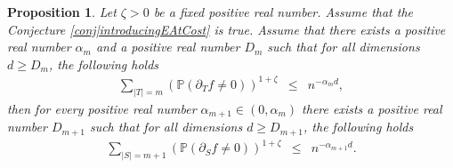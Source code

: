 \documentclass[reqno]{amsart}
\newtheorem{proposition}[theorem]{Proposition}
\begin{document}
 \begin{proposition}\label{thm|inductionStep}
Let $\zeta>0$ be a fixed positive real number. Assume that the Conjecture \ref{conj|introducingEAtCost} is true. Assume that there exists a positive real number $\alpha_m$ and a positive real number $D_m$ such that for all dimensions $d\geq D_m$, the following holds
\begin{eqnarray}
\sum_{|T|=m} \left(\mathbb P\left(\partial_Tf\neq 0\right)\right)^{1+\zeta}&\leq&  n^{-\alpha_md}, \label{eqn|boundOrderk}
\end{eqnarray}
then for every positive real number $\alpha_{m+1}\in(0,\alpha_m)$ there exists a positive real number $D_{m+1}$ such that for all dimensions $d\geq D_{m+1}$, the following holds
\begin{eqnarray}
\sum_{|S|=m+1} \left(\mathbb P\left(\partial_Sf\neq 0\right)\right)^{1+\zeta}&\leq& n^{-\alpha_{m+1}d}. \label{eqn|boundOrderkp1}
\end{eqnarray}
 \end{proposition}
\end{document}
